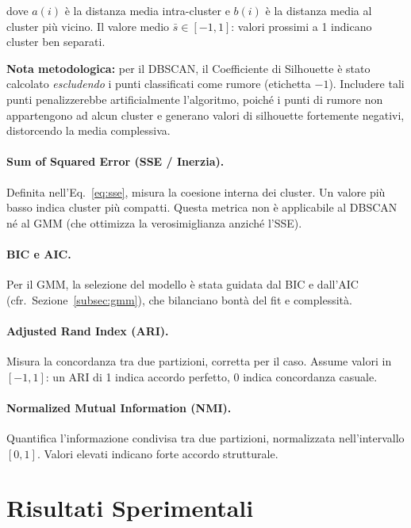 \documentclass[a4paper,12pt]{article}
\begin{document}
dove $a(i)$ è la distanza media intra-cluster e $b(i)$ è la distanza
media al cluster più vicino. Il valore medio $\bar{s} \in [-1, 1]$:
valori prossimi a 1 indicano cluster ben separati.

\textbf{Nota metodologica:} per il DBSCAN, il Coefficiente di Silhouette
è stato calcolato \emph{escludendo} i punti classificati come rumore
(etichetta $-1$). Includere tali punti penalizzerebbe artificialmente
l'algoritmo, poiché i punti di rumore non appartengono ad alcun cluster e
generano valori di silhouette fortemente negativi, distorcendo la media
complessiva.

\paragraph{Sum of Squared Error (SSE / Inerzia).} Definita
nell'Eq.~\eqref{eq:sse}, misura la coesione interna dei cluster. Un
valore più basso indica cluster più compatti. Questa metrica non è
applicabile al DBSCAN né al GMM (che ottimizza la verosimiglianza
anziché l'SSE).

\paragraph{BIC e AIC.} Per il GMM, la selezione del modello è stata
guidata dal BIC e dall'AIC (cfr.\ Sezione~\ref{subsec:gmm}), che bilanciano
bontà del fit e complessità.

\paragraph{Adjusted Rand Index (ARI).} Misura la concordanza tra due
partizioni, corretta per il caso. Assume valori in $[-1, 1]$: un ARI
di 1 indica accordo perfetto, 0 indica concordanza casuale.

\paragraph{Normalized Mutual Information (NMI).} Quantifica
l'informazione condivisa tra due partizioni, normalizzata nell'intervallo
$[0, 1]$. Valori elevati indicano forte accordo strutturale.


\section{Risultati Sperimentali}
\label{sec:risultati}
\end{document}
